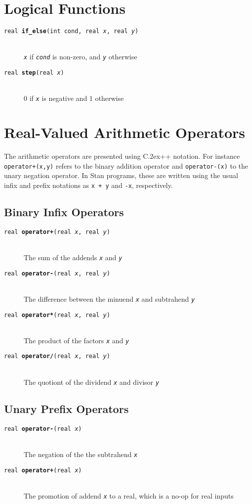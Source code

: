 \documentclass[10pt]{report}
\newcommand{\Stan}{Stan\xspace}
\newcommand*{\Cpp}{C\raise.2ex\hbox{\footnotesize ++}\xspace} %
\newcommand{\code}[1]{{\tt #1}}
\newcommand{\fitem}[4]{\item[{\tt #1 {\bfseries #2}(#3)}]\mbox{ } \\[4pt] #4}
\newcommand{\farg}[1]{{\tt\slshape #1}}
\begin{document}
\section{Logical Functions}

\begin{description}
%
\fitem{real}{if\_else}{int cond, real \farg{x}, real \farg{y}}{
\farg{x} if \farg{cond} is non-zero, and \farg{y} otherwise}
%
\fitem{real}{step}{real \farg{x}}{
0 if \farg{x} is negative and 1 otherwise}
%
\end{description}


\section{Real-Valued Arithmetic Operators}\label{real-valued-arithmetic-operators.section}

The arithmetic operators are presented using \Cpp notation.  For
instance \code{operator+(x,y)} refers to the binary addition operator
and \code{operator-(x)} to the unary negation operator.  In \Stan
programs, these are written using the usual infix and prefix notations
as \code{x~+~y} and \code{-x}, respectively.

\subsection{Binary Infix Operators}

\begin{description}
%
\fitem{real}{operator+}{real \farg{x}, real \farg{y}}{
The sum of the addends \farg{x} and \farg{y}}
%
\fitem{real}{operator-}{real \farg{x}, real \farg{y}}{
The difference between the minuend \farg{x} and subtrahend \farg{y}}
%
\fitem{real}{operator*}{real \farg{x}, real \farg{y}}{
The product of the factors \farg{x} and \farg{y}}
%
\fitem{real}{operator/}{real \farg{x}, real \farg{y}}{
The quotiont of the dividend \farg{x} and divisor \farg{y}}
%
\end{description}

\subsection{Unary Prefix Operators}

\begin{description}
\fitem{real}{operator-}{real \farg{x}}{
The negation of the the subtrahend \farg{x}}

\fitem{real}{operator+}{real \farg{x}}{
The promotion of addend \farg{x} to a real, which is a no-op
for real inputs}
\end{description}
\end{document}
